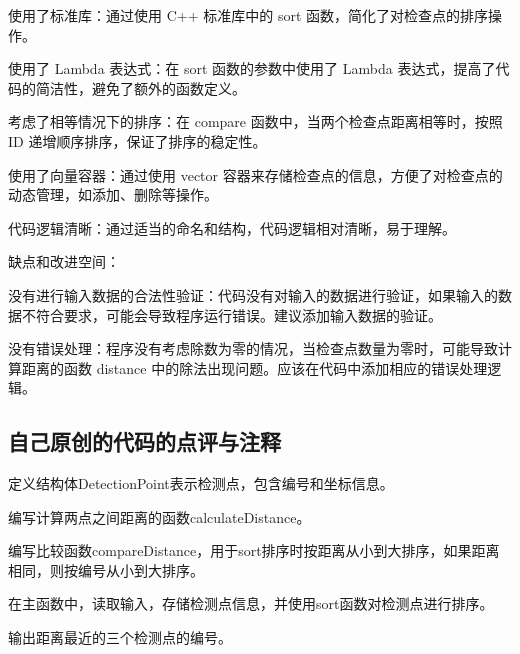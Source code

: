 使用了标准库：通过使用 C++ 标准库中的 sort 函数，简化了对检查点的排序操作。

使用了 Lambda 表达式：在 sort 函数的参数中使用了 Lambda 表达式，提高了代码的简洁性，避免了额外的函数定义。

考虑了相等情况下的排序：在 compare 函数中，当两个检查点距离相等时，按照 ID 递增顺序排序，保证了排序的稳定性。

使用了向量容器：通过使用 vector 容器来存储检查点的信息，方便了对检查点的动态管理，如添加、删除等操作。

代码逻辑清晰：通过适当的命名和结构，代码逻辑相对清晰，易于理解。

缺点和改进空间：

没有进行输入数据的合法性验证：代码没有对输入的数据进行验证，如果输入的数据不符合要求，可能会导致程序运行错误。建议添加输入数据的验证。

没有错误处理：程序没有考虑除数为零的情况，当检查点数量为零时，可能导致计算距离的函数 distance 中的除法出现问题。应该在代码中添加相应的错误处理逻辑。

\subsection{自己原创的代码的点评与注释}

定义结构体DetectionPoint表示检测点，包含编号和坐标信息。

编写计算两点之间距离的函数calculateDistance。

编写比较函数compareDistance，用于sort排序时按距离从小到大排序，如果距离相同，则按编号从小到大排序。

在主函数中，读取输入，存储检测点信息，并使用sort函数对检测点进行排序。

输出距离最近的三个检测点的编号。

